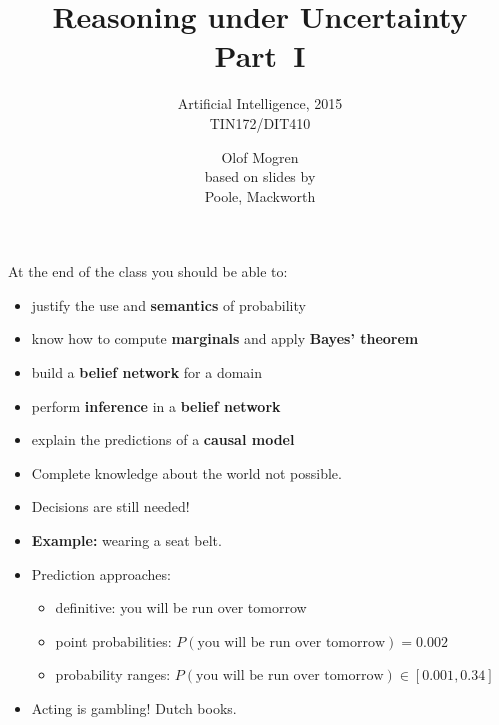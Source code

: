 \documentclass[12pt]{beamer} %
\title{Reasoning under Uncertainty Part~I}
\subtitle{Artificial Intelligence, 2015\\ TIN172/DIT410} %
\author[Olof Mogren]{Olof Mogren\\ \tiny{based on slides by\\ Poole, Mackworth}} %
\institute{Chalmers University of Technology}
\begin{document}
\begin{frame}[plain]
 \titlepage
\end{frame}

\begin{slide}
At the end of the class you should be able to:
\begin{itemize}
\item justify the use and \textbf{semantics} of probability
\item know how to compute \textbf{marginals} and apply \textbf{Bayes' theorem}
\item build a \textbf{belief network} for a domain
\item perform \textbf{inference} in a \textbf{belief network}
\item explain the predictions of a \textbf{causal model}
\end{itemize}
\end{slide}


\begin{slide}
\begin{itemize}
\item Complete knowledge about the world not possible.
\item Decisions are still needed!
\item \textbf{Example:} wearing a seat belt. 
\end{itemize}
\end{slide}

\begin{slide}
\begin{itemize}
\item Prediction approaches:%
  \begin{itemize}
  \item definitive: you will be run over tomorrow
  \item point probabilities: $P(\text{you will be run over tomorrow}) = 0.002$
  \item probability ranges: $P(\text{you will be run over tomorrow}) \in [0.001, 0.34]$
  \end{itemize}
\item Acting is gambling! %
  Dutch books.
\end{itemize}

\end{slide}
\end{document}
